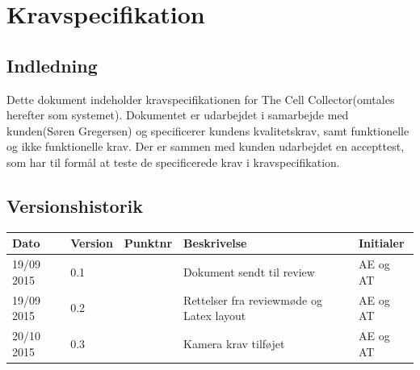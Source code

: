 \chapter{Kravspecifikation} \label{ch:ks}

\section{Indledning}
Dette dokument indeholder kravspecifikationen for The Cell Collector(omtales herefter som systemet). Dokumentet er udarbejdet i samarbejde med kunden(Søren Gregersen) og specificerer kundens kvalitetskrav, samt funktionelle og ikke funktionelle krav. Der er sammen med kunden udarbejdet en accepttest, som har til formål at teste de specificerede krav i kravspecifikation.
\section{Versionshistorik}
\begin{center}
		\begin{longtable}{ | m{2.5cm} | m{2.5cm}| m{2.5cm}| m{2.5cm}| m{2.5cm}| } 
			\hline
			\textbf{Dato} & \textbf{Version} & \textbf{Punktnr} & \textbf{Beskrivelse} & \textbf{Initialer}  \\ 
			\hline
			19/09 2015 &  0.1 & & Dokument sendt til review & AE og AT \\
			\hline
		19/09 2015 &  0.2 & & Rettelser fra reviewmøde og Latex layout & AE og AT \\
		\hline
		20/10 2015 &  0.3 & & Kamera krav tilføjet & AE og AT \\
			\hline
		\end{longtable}
		
	\end{center}

\newpage
